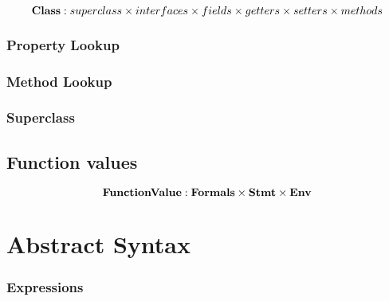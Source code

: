 \documentclass{article}
\begin{document}
\[
\mathbf{Class} : superclass \times interfaces \times fields \times getters \times setters \times methods
\]
\subsubsection{Property Lookup}
\label{subsubsec:property-lookup}


\subsubsection{Method Lookup}
\label{subsubsec:method-lookup}
\subsubsection{Superclass}
\label{subsubsec:superclass}

\subsection{Function values}
\label{subsec:function-values}
\[
	\mathbf{FunctionValue} : \mathbf{Formals} \times \mathbf{Stmt} \times \mathbf{Env}
\]

\section{Abstract Syntax}
\label{sec:abstract-syntax}

\subsubsection{Expressions}
\label{sec:expr-syntax}

\newcommand{\VariableGet}[1]{#1}
\newcommand{\VariableSet}[2]{#1=#2}

\newcommand{\PropertyGet}[2]{#1.#2}
\newcommand{\PropertySet}[3]{#1.#2=#3}

\newcommand{\DirectPropertyGet}[2]{#1.\{#2\}}
\newcommand{\DirectPropertySet}[3]{#1.\{#2\}=#3}

\newcommand{\SuperPropertyGet}[1]{\tt{super}.#1}
\newcommand{\SuperPropertySet}[2]{\tt{super}.#1=#2}

\newcommand{\StaticGet}[1]{#1}
\newcommand{\StaticSet}[2]{#1=#2}

\newcommand{\InstanceMethodInvocation}[3]{#1.#2(#3)}
\newcommand{\DInstanceMethodInvocation}[3]{#1.\{#2\}(#3)}
\newcommand{\SuperMethodInvocation}[2]{\tt{super}.#1(#2)}
\newcommand{\StaticInvocation}[2]{#1(#2)}
\end{document}
